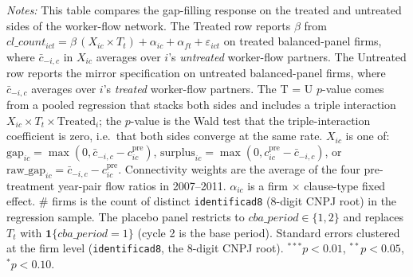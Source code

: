 \begin{table}[H]
\begin{minipage}{\linewidth}
\textit{Notes:} This table compares the gap-filling response on the treated and untreated sides of the worker-flow network. The Treated row reports $\beta$ from $cl\_count_{ict} = \beta\,(X_{ic} \times T_t) + \alpha_{ic} + \alpha_{ft} + \varepsilon_{ict}$ on treated balanced-panel firms, where $\bar c_{-i,c}$ in $X_{ic}$ averages over $i$'s \textit{untreated} worker-flow partners. The Untreated row reports the mirror specification on untreated balanced-panel firms, where $\bar c_{-i,c}$ averages over $i$'s \textit{treated} worker-flow partners. The T = U $p$-value comes from a pooled regression that stacks both sides and includes a triple interaction $X_{ic} \times T_t \times \text{Treated}_i$; the $p$-value is the Wald test that the triple-interaction coefficient is zero, i.e.\ that both sides converge at the same rate. $X_{ic}$ is one of: $\text{gap}_{ic} = \max(0, \bar{c}_{-i,c} - c^{\text{pre}}_{ic})$, $\text{surplus}_{ic} = \max(0, c^{\text{pre}}_{ic} - \bar{c}_{-i,c})$, or $\text{raw\_gap}_{ic} = \bar{c}_{-i,c} - c^{\text{pre}}_{ic}$. Connectivity weights are the average of the four pre-treatment year-pair flow ratios in 2007--2011. $\alpha_{ic}$ is a firm $\times$ clause-type fixed effect. \# firms is the count of distinct \texttt{identificad8} (8-digit CNPJ root) in the regression sample. The placebo panel restricts to $cba\_period \in \{1, 2\}$ and replaces $T_t$ with $\mathbf{1}\{cba\_period = 1\}$ (cycle 2 is the base period). Standard errors clustered at the firm level (\texttt{identificad8}, the 8-digit CNPJ root). $^{***}p<0.01$, $^{**}p<0.05$, $^{*}p<0.10$.
\end{minipage}
\end{table}
